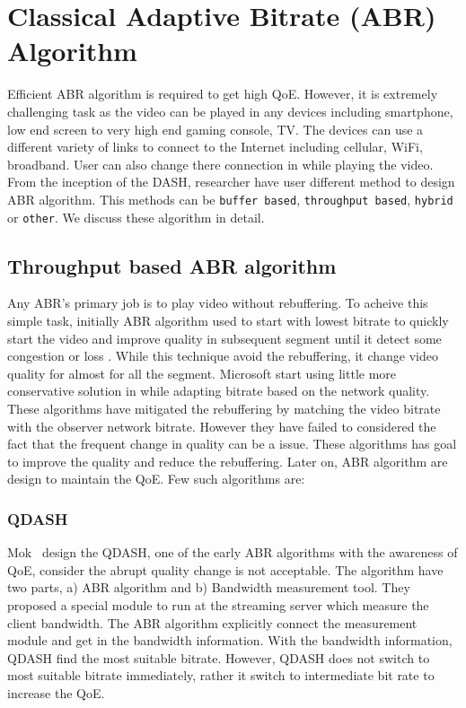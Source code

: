 \section{Classical Adaptive Bitrate (ABR) Algorithm}
Efficient ABR algorithm is required to get high QoE. However, it is extremely challenging task as the video can be played in any devices including smartphone, low end screen to very high end gaming console, TV. The devices can use a different variety of links to connect to the Internet including cellular, WiFi, broadband. User can also change there connection in while playing the video. From the inception of the DASH, researcher have user different method to design ABR algorithm. This methods can be {\tt buffer based}, {\tt throughput based}, {\tt hybrid} or {\tt other}. We discuss these algorithm in detail.

\subsection{Throughput based ABR algorithm}
Any ABR's primary job is to play video without rebuffering. To acheive this simple task, initially ABR algorithm used to start with lowest bitrate to quickly start the video and improve quality in subsequent segment until it detect some congestion or loss \cite{5677508,10.1145/1943552.1943575}. While this technique avoid the rebuffering, it change video quality for almost for all the segment. Microsoft start using little more conservative solution in \cite{10.1145/1943552.1943574} while adapting bitrate based on the network quality. These algorithms have mitigated the rebuffering by matching the video bitrate with the observer network bitrate. However they have failed to considered the fact that the frequent change in quality can be a issue. These algorithms has goal to improve the quality and reduce the rebuffering. Later on, ABR algorithm are design to maintain the QoE. Few such algorithms are:

\subsubsection{QDASH\cite{10.1145/2155555.2155558}}
Mok \etal\ design the QDASH\cite{10.1145/2155555.2155558}, one of the early ABR algorithms with the awareness of QoE, consider the abrupt quality change is not acceptable. The algorithm have two parts, a) ABR algorithm and b) Bandwidth measurement tool. They proposed a special module to run at the streaming server which measure the client bandwidth. The ABR algorithm explicitly connect the measurement module and get in the bandwidth information. With the bandwidth information, QDASH find the most suitable bitrate. However, QDASH does not switch to most suitable bitrate immediately, rather it switch to intermediate bit rate to increase the QoE.


